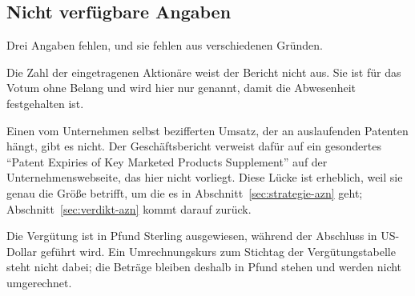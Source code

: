 \subsection{Nicht verf\"ugbare Angaben}

Drei Angaben fehlen, und sie fehlen aus verschiedenen Gr\"unden.

Die Zahl der eingetragenen Aktion\"are weist der Bericht nicht aus. Sie ist f\"ur
das Votum ohne Belang und wird hier nur genannt, damit die Abwesenheit
festgehalten ist.

Einen vom Unternehmen selbst bezifferten Umsatz, der an auslaufenden Patenten
h\"angt, gibt es nicht. Der Gesch\"aftsbericht verweist daf\"ur auf ein
gesondertes \enquote{Patent Expiries of Key Marketed Products Supplement} auf
der Unternehmenswebseite, das hier nicht vorliegt.
Diese L\"ucke ist erheblich, weil sie genau die Gr\"o{\ss}e betrifft, um die es
in Abschnitt~\ref{sec:strategie-azn} geht; Abschnitt~\ref{sec:verdikt-azn}
kommt darauf zur\"uck.

Die Verg\"utung ist in Pfund Sterling ausgewiesen, w\"ahrend der Abschluss in
US-Dollar gef\"uhrt wird. Ein Umrechnungskurs zum Stichtag der
Verg\"utungstabelle steht nicht dabei; die Betr\"age bleiben deshalb in Pfund
stehen und werden nicht umgerechnet.

